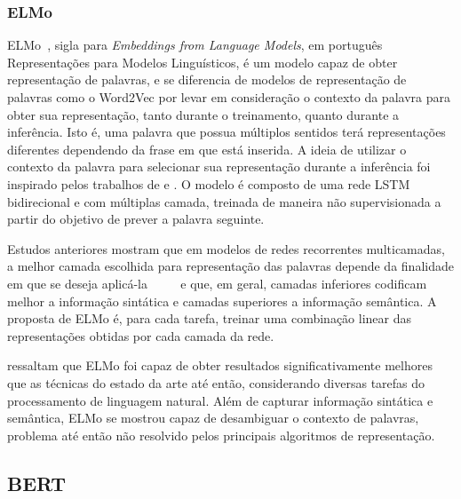 \subsubsection{ELMo}

ELMo~\cite{peters18}, sigla para \textit{Embeddings from Language Models}, em
português Representações para Modelos Linguísticos, é um modelo capaz de obter
representação de palavras, e se diferencia de modelos de representação de
palavras como o Word2Vec por levar em consideração o contexto da palavra para
obter sua representação, tanto durante o treinamento, quanto durante a
inferência.
Isto é, uma palavra que possua múltiplos sentidos terá representações diferentes
dependendo da frase em que está inserida.
A ideia de utilizar o contexto da palavra para selecionar sua representação
durante a inferência foi inspirado pelos trabalhos de \citet{peters17} e
\citet{mccann17}.
O modelo é composto de uma rede LSTM~\cite{hochreiter97} bidirecional e com
múltiplas camada, treinada de maneira não supervisionada a partir do objetivo de
prever a palavra seguinte.


Estudos anteriores mostram que em modelos de redes recorrentes multicamadas,
a melhor camada escolhida para representação das palavras depende da finalidade
em que se deseja aplicá-la
~\cite{hashimoto16}~\cite{sogaard16}~\cite{belinkov17}~\cite{melamud16} e que,
em geral, camadas inferiores codificam melhor a informação sintática e camadas
superiores a informação semântica.
A proposta de ELMo é, para cada tarefa, treinar uma combinação linear das
representações obtidas por cada camada da rede.

\citet{peters18} ressaltam que ELMo foi capaz de obter resultados significativamente
melhores que as técnicas do estado da arte até então, considerando diversas tarefas
do processamento de linguagem natural.
Além de capturar informação sintática e semântica, ELMo se mostrou capaz de
desambiguar o contexto de palavras, problema até então não resolvido pelos
principais algoritmos de representação.

\subsection{BERT}

